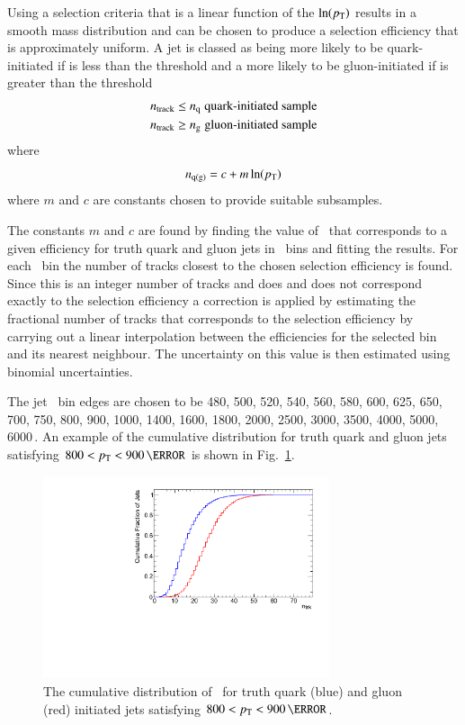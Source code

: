 Using a selection criteria that is a linear function of the \( \ln(p_{\mathrm T}) \) 
results in a smooth mass distribution and can be chosen to produce a  
selection efficiency that is approximately uniform. 
A jet is classed as being more likely to be quark-initiated if \ntrk is less than
the threshold \nq and a more likely to be gluon-initiated if \ntrk is 
greater than the threshold \ngluon  
\begin{align}
\ntrk & \le \nq \; \mbox{quark-initiated sample} %
\\
\ntrk	  & \ge \ngluon \; \mbox{gluon-initiated sample} \nonumber
\end{align}
where   
\begin{equation}
n_{\mathrm{q(g)}} = {c + m \ln(p_{\mathrm T})}  \label{eq:nqg2}
\end{equation}
where $m$ and $c$ are constants chosen to provide suitable subsamples.

The constants $m$ and $c$ are found by finding the value of \ntrk\ 
that corresponds to a given efficiency for truth quark and gluon jets in 
\pT\ bins and fitting the results. For each \pT\ bin the number of tracks 
closest to the chosen selection efficiency is found. Since this is an integer 
number of tracks and does and does not correspond exactly to the selection efficiency 
a correction is applied by estimating the fractional number of tracks that corresponds 
to the selection  efficiency  by carrying out a linear interpolation between the efficiencies 
for the selected bin and its nearest neighbour. The uncertainty on this value is then estimated using 
binomial uncertainties. 


The jet \pT\ bin edges are chosen to be 
480, 500, 520, 540, 560, 580, 600, 625, 650, 700, 750, 800, 900, 1000, 1400, 
1600, 1800, 2000, 2500, 3000, 3500, 4000, 5000, 6000\,\GeV. An example of the \ntrk cumulative 
distribution for truth quark and gluon jets satisfying $800 < \pT < 900\,\GeV$ is shown in
Fig.~\ref{fig:ntrk_cumulative}.


\begin{figure}[htb]
 \centering
\includegraphics[width=0.75\textwidth]{figures/tagging/Cumulative_ntrk_distribution_12_800_900GeV.pdf}
\caption{The cumulative distribution of \ntrk\ for truth quark (blue) and gluon (red) initiated jets 
satisfying $800 < \pT < 900\,\GeV$.  \label{fig:ntrk_cumulative}}
\end{figure}


